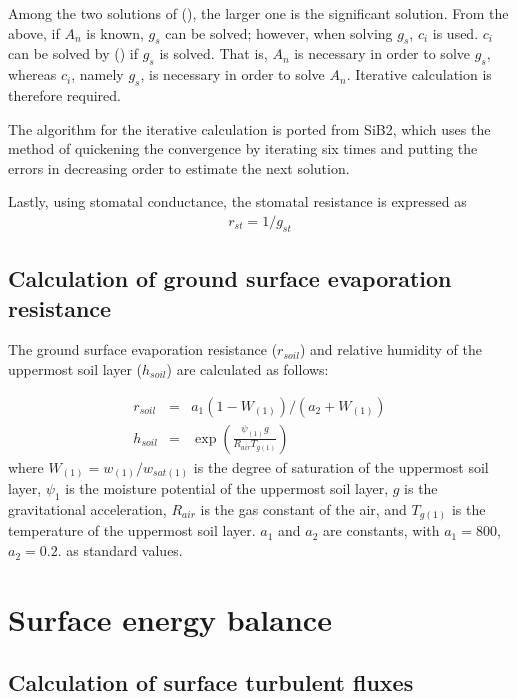 Among the two solutions of (\hyperref[eq100]{}), the larger one is the significant solution. From the above, if \(A_n\) is known, \(g_s\) can be solved; however, when solving \(g_s\), \(c_i\) is used.
\(c_i\) can be solved by (\hyperref[eq99]{}) if \(g_s\) is solved. That is, \(A_n\) is necessary in order to solve \(g_s\), whereas \(c_i\), namely \(g_s\), is necessary in order to solve \(A_n\).
Iterative calculation is therefore required.

The algorithm for the iterative calculation is ported from SiB2, which uses the method of quickening the convergence by iterating six times and putting the errors in decreasing order to estimate the
next solution.

Lastly, using stomatal conductance, the stomatal resistance is expressed as \begin{eqnarray}
 r_{st} = 1/g_{st}
\end{eqnarray}

\subsection{Calculation of ground surface evaporation resistance}\label{calculation-of-ground-surface-evaporation-resistance}

The ground surface evaporation resistance (\(r_{soil}\)) and relative humidity of the uppermost soil layer (\(h_{soil}\)) are calculated as follows:

\begin{eqnarray}
 r_{soil} &=& a_1 ( 1 - W_{(1)} ) / ( a_2 + W_{(1)} ) \\
 h_{soil} &=& \exp \left(\frac{\psi_{(1)} g}{R_{air} T_{g(1)}} \right)
\end{eqnarray} where \(W_{(1)} = w_{(1)}/w_{sat(1)}\) is the degree of saturation of the uppermost soil layer, \(\psi_{1}\) is the moisture potential of the uppermost soil layer, \(g\) is the gravitational
acceleration, \(R_{air}\) is the gas constant of the air, and \(T_{g(1)}\) is the temperature of the uppermost soil layer. \(a_1\) and \(a_2\) are constants, with \(a_1=800\), \(a_2=0.2\). as standard
values.

\section{Surface energy balance}\label{surface-energy-balance}

\subsection{Calculation of surface turbulent fluxes}\label{calculation-of-surface-turbulent-fluxes}


